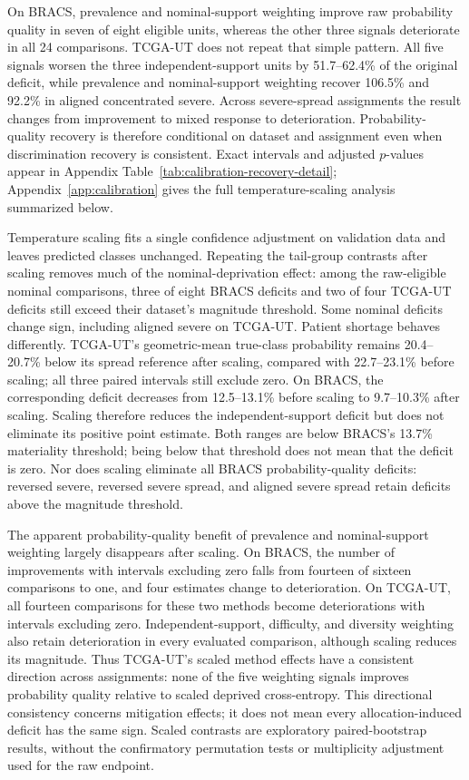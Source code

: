 \documentclass[11pt]{article}
\begin{document}
\noindent On BRACS, prevalence and nominal-support weighting improve raw probability quality in seven of eight eligible units, whereas the other three signals deteriorate in all \num{24} comparisons. TCGA-UT does not repeat that simple pattern. All five signals worsen the three independent-support units by \num{51.7}--\num{62.4}\% of the original deficit, while prevalence and nominal-support weighting recover \num{106.5}\% and \num{92.2}\% in aligned concentrated severe. Across severe-spread assignments the result changes from improvement to mixed response to deterioration. Probability-quality recovery is therefore conditional on dataset and assignment even when discrimination recovery is consistent. Exact intervals and adjusted $p$-values appear in Appendix Table~\ref{tab:calibration-recovery-detail}; Appendix~\ref{app:calibration} gives the full temperature-scaling analysis summarized below.

Temperature scaling fits a single confidence adjustment on validation data and leaves predicted classes unchanged. Repeating the tail-group contrasts after scaling removes much of the nominal-deprivation effect: among the raw-eligible nominal comparisons, three of eight BRACS deficits and two of four TCGA-UT deficits still exceed their dataset's magnitude threshold. Some nominal deficits change sign, including aligned severe on TCGA-UT. Patient shortage behaves differently. TCGA-UT's geometric-mean true-class probability remains \num{20.4}--\num{20.7}\% below its spread reference after scaling, compared with \num{22.7}--\num{23.1}\% before scaling; all three paired intervals still exclude zero. On BRACS, the corresponding deficit decreases from \num{12.5}--\num{13.1}\% before scaling to \num{9.7}--\num{10.3}\% after scaling. Scaling therefore reduces the independent-support deficit but does not eliminate its positive point estimate. Both ranges are below BRACS's \num{13.7}\% materiality threshold; being below that threshold does not mean that the deficit is zero. Nor does scaling eliminate all BRACS probability-quality deficits: reversed severe, reversed severe spread, and aligned severe spread retain deficits above the magnitude threshold.

The apparent probability-quality benefit of prevalence and nominal-support weighting largely disappears after scaling. On BRACS, the number of improvements with intervals excluding zero falls from fourteen of sixteen comparisons to one, and four estimates change to deterioration. On TCGA-UT, all fourteen comparisons for these two methods become deteriorations with intervals excluding zero. Independent-support, difficulty, and diversity weighting also retain deterioration in every evaluated comparison, although scaling reduces its magnitude. Thus TCGA-UT's scaled method effects have a consistent direction across assignments: none of the five weighting signals improves probability quality relative to scaled deprived cross-entropy. This directional consistency concerns mitigation effects; it does not mean every allocation-induced deficit has the same sign. Scaled contrasts are exploratory paired-bootstrap results, without the confirmatory permutation tests or multiplicity adjustment used for the raw endpoint.
\end{document}

